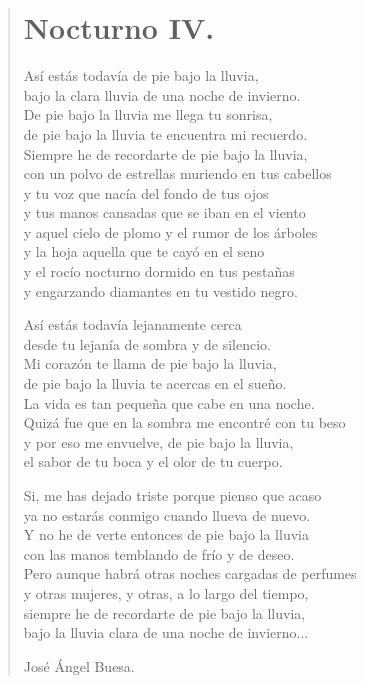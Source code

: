 \documentclass[11pt, portrait, twoside, notitlepage, openright]{book}
\begin{document}
\newpage
\begin{verse}
\begin{center}
\section{Nocturno IV.}
\end{center}
Así estás todavía de pie bajo la lluvia,\\
bajo la clara lluvia de una noche de invierno.\\
De pie bajo la lluvia me llega tu sonrisa,\\
de pie bajo la lluvia te encuentra mi recuerdo.\\
Siempre he de recordarte de pie bajo la lluvia,\\
con un polvo de estrellas muriendo en tus cabellos\\
y tu voz que nacía del fondo de tus ojos\\
y tus manos cansadas que se iban en el viento\\
y aquel cielo de plomo y el rumor de los árboles\\
y la hoja aquella que te cayó en el seno\\
y el rocío nocturno dormido en tus pestañas\\
y engarzando diamantes en tu vestido negro.
\newline

Así estás todavía lejanamente cerca\\
desde tu lejanía de sombra y de silencio.\\
Mi corazón te llama de pie bajo la lluvia,\\
de pie bajo la lluvia te acercas en el sueño.\\
La vida es tan pequeña que cabe en una noche.\\
Quizá fue que en la sombra me encontré con tu beso\\
y por eso me envuelve, de pie bajo la lluvia,\\
el sabor de tu boca y el olor de tu cuerpo.
\newpage

Si, me has dejado triste porque pienso que acaso\\
ya no estarás conmigo cuando llueva de nuevo.\\
Y no he de verte entonces de pie bajo la lluvia\\
con las manos temblando de frío y de deseo.\\
Pero aunque habrá otras noches cargadas de perfumes\\
y otras mujeres, y otras, a lo largo del tiempo,\\
siempre he de recordarte de pie bajo la lluvia,\\
bajo la lluvia clara de una noche de invierno...
\newline

José Ángel Buesa.
\end{verse}
\end{document}
